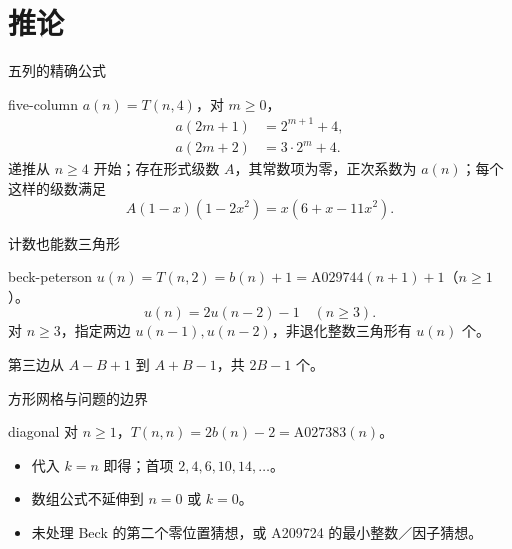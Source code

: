 \documentclass{beamer}
\begin{document}
\section{推论}
\begin{frame}{五列的精确公式}
\begin{bookresult}{five-column}
$a(n)=T(n,4)$，对 $m\geq0$，
\[
\begin{aligned}
a(2m+1)&=2^{m+1}+4,\\
a(2m+2)&=3\cdot2^m+4.
\end{aligned}
\]
递推从 $n\geq4$ 开始；存在形式级数 $A$，其常数项为零，正次系数为 $a(n)$；每个这样的级数满足
\[
A(1-x)(1-2x^2)=x(6+x-11x^2).
\]
\end{bookresult}
\end{frame}
\begin{frame}{计数也能数三角形}
\begin{bookresult}{beck-peterson}
$u(n)=T(n,2)=b(n)+1=\mathrm{A029744}(n+1)+1$（$n\geq1$）。
\[
u(n)=2u(n-2)-1\quad(n\geq3).
\]
对 $n\geq3$，指定两边 $u(n-1),u(n-2)$，非退化整数三角形有 $u(n)$ 个。
\end{bookresult}
第三边从 $A-B+1$ 到 $A+B-1$，共 $2B-1$ 个。
\end{frame}
\begin{frame}{方形网格与问题的边界}
\begin{bookresult}{diagonal}
对 $n\geq1$，$T(n,n)=2b(n)-2=\mathrm{A027383}(n)$。
\end{bookresult}
\begin{itemize}
\item 代入 $k=n$ 即得；首项 $2,4,6,10,14,\ldots$。
\item 数组公式不延伸到 $n=0$ 或 $k=0$。
\item 未处理 Beck 的第二个零位置猜想，或 A209724 的最小整数／因子猜想。
\end{itemize}
\end{frame}
\end{document}

